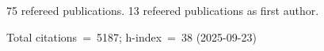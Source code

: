 75 refereed publications. 13 refeered publications as first author.

Total citations~=~5187; h-index~=~38 (2025-09-23)